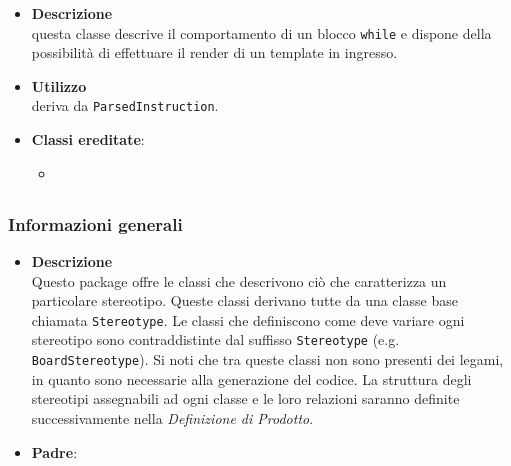 \label{\nogloxy{swedesigner::server::project::ParsedWhile}}
\begin{itemize}
\item \textbf{Descrizione}\\
questa classe descrive il comportamento di un blocco \texttt{while} e dispone della possibilità di effettuare il render di un template in ingresso.
\item \textbf{Utilizzo}\\
deriva da \texttt{ParsedInstruction}.
\item \textbf{Classi ereditate}:
\begin{itemize}
\item \hyperref[\nogloxy{swedesigner::server::project::ParsedInstruction}]{}
\end{itemize}
\end{itemize}
\subsection{}
\label{\nogloxy{swedesigner::server::stereotype}}
\subsubsection{Informazioni generali}
\begin{itemize}
\item \textbf{Descrizione}\\
Questo package offre le classi che descrivono ciò che caratterizza un particolare stereotipo. Queste classi derivano tutte da una classe base chiamata \texttt{Stereotype}. Le classi che definiscono come deve variare ogni stereotipo sono contraddistinte dal suffisso \texttt{Stereotype} (e.g. \texttt{BoardStereotype}). Si noti che tra queste classi non sono presenti dei legami, in quanto sono necessarie alla generazione del codice. La struttura degli stereotipi assegnabili ad ogni classe e le loro relazioni saranno definite successivamente nella \emph{Definizione di Prodotto}.
\item \textbf{Padre}: \hyperref[\nogloxy{swedesigner::server}]{}
\end{itemize}

\subsection{}
\label{\nogloxy{swedesigner::server::template}}
